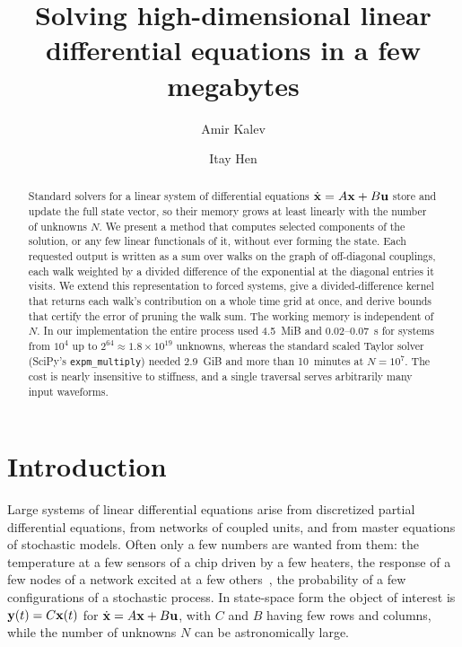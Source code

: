 \documentclass[aps,pra,superscriptaddress,floatfix,longbibliography,twocolumn]{revtex4-2}
\newcommand{\bx}{{\bf x}}
\newcommand{\bu}{{\bf u}}
\newcommand{\by}{{\bf y}}
\begin{document}
\title{Solving high-dimensional linear differential equations in a few megabytes}
\author{Amir Kalev}
\author{Itay Hen}

\begin{abstract}
Standard solvers for a linear system of differential equations $\dot\bx=A\bx+B\bu$ store and update the full state vector, so their memory grows at least linearly with the number of unknowns $N$. We present a method that computes selected components of the solution, or any few linear functionals of it, without ever forming the state. Each requested output is written as a sum over walks on the graph of off-diagonal couplings, each walk weighted by a divided difference of the exponential at the diagonal entries it visits. We extend this representation to forced systems, give a divided-difference kernel that returns each walk's contribution on a whole time grid at once, and derive bounds that certify the error of pruning the walk sum. The working memory is independent of $N$. In our implementation the entire process used 4.5~MiB and 0.02--0.07~s for systems from $10^4$ up to $2^{64}\approx1.8\times10^{19}$ unknowns, whereas the standard scaled Taylor solver (SciPy's \texttt{expm\_multiply}) needed 2.9~GiB and more than 10~minutes at $N=10^7$. The cost is nearly insensitive to stiffness, and a single traversal serves arbitrarily many input waveforms.
\end{abstract}
\maketitle

\section{Introduction}\label{sec:intro}

Large systems of linear differential equations arise from discretized partial differential equations, from networks of coupled units, and from master equations of stochastic models. Often only a few numbers are wanted from them: the temperature at a few sensors of a chip driven by a few heaters, the response of a few nodes of a network excited at a few others~\cite{liu2011,pasqualetti2014,mesbahi2010}, the probability of a few configurations of a stochastic process. In state-space form the object of interest is $\by(t)=C\bx(t)$ for $\dot\bx=A\bx+B\bu$, with $C$ and $B$ having few rows and columns, while the number of unknowns $N$ can be astronomically large.
\end{document}

